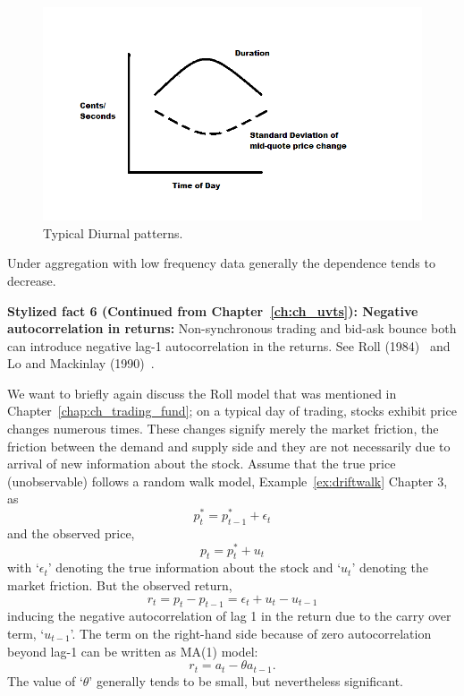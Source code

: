 	\begin{figure}[!ht]
	\centering
	\includegraphics[width=\textwidth]{chapters/chapter_advanced/figures/Sec2-10Fig8.png}	
	\caption{Typical Diurnal patterns. \label{fig:diurnal}}
	\end{figure}

Under aggregation with low frequency data generally the dependence tends to decrease.\twomedskip

\noindent\textbf{Stylized fact 6 (Continued from Chapter~\ref{ch:ch_uvts}): Negative autocorrelation in returns:} Non-synchronous trading and bid-ask bounce both can introduce negative lag-1 autocorrelation in the returns. See Roll (1984)~\cite{roll1984} and Lo and Mackinlay (1990)~\cite{lo1990}.\twomedskip


We want to briefly again discuss the Roll model that was mentioned in Chapter~\ref{chap:ch_trading_fund}; on a typical day of trading, stocks exhibit price changes numerous times. These changes signify merely the market friction, the friction between the demand and supply side and they are not necessarily due to arrival of new information about the stock. Assume that the true price (unobservable) follows a random walk model, Example~\ref{ex:driftwalk} Chapter 3, as
	\begin{equation} \label{eqn:2plowstar}
	p_t^*=p_{t-1}^* + \epsilon_t 
	\end{equation}
and the observed price,
	\begin{equation} \label{eqn:2lowpstar}
	p_t = p_t^* + u_t
	\end{equation}
with `$\epsilon_t$' denoting the true information about the stock and `$u_t$' denoting the market friction. But the observed return,
	\begin{equation} \label{eqn:2firstrtlow}
	r_t=p_t-p_{t-1} = \epsilon_t + u_t - u_{t-1}
	\end{equation}
inducing the negative autocorrelation of lag 1 in the return due to the carry over term, `$u_{t-1}$'. The term on the right-hand side because of zero autocorrelation beyond lag-1 can be written as MA(1) model:
	\begin{equation} \label{eqn:2lowrt}
	r_t=a_t - \theta a_{t-1}.
	\end{equation}
The value of `$\theta$' generally tends to be small, but nevertheless significant. \twomedskip


